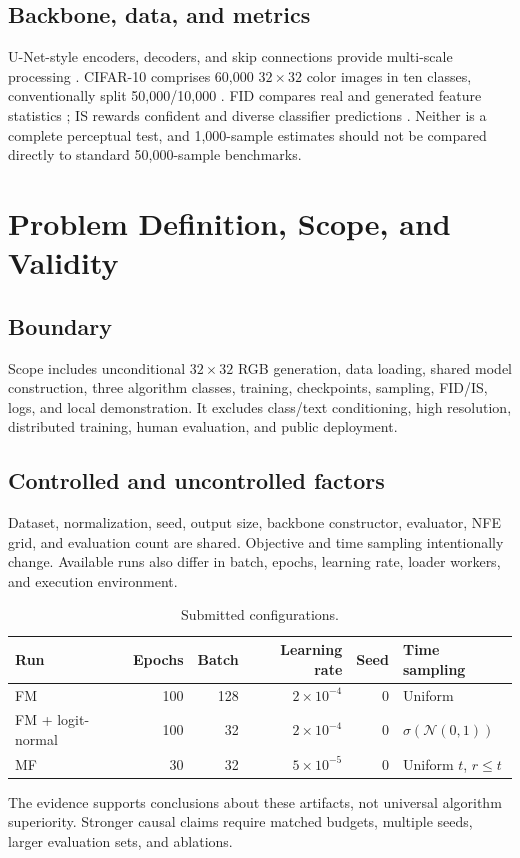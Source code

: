 \documentclass{iutbscthesis}
\begin{document}
\section{Backbone, data, and metrics}
U-Net-style encoders, decoders, and skip connections provide multi-scale processing \cite{ronneberger2015unet}. CIFAR-10 comprises 60,000 $32\times32$ color images in ten classes, conventionally split 50,000/10,000 \cite{krizhevsky2009learning}. FID compares real and generated feature statistics \cite{heusel2017gans}; IS rewards confident and diverse classifier predictions \cite{salimans2016improved}. Neither is a complete perceptual test, and 1,000-sample estimates should not be compared directly to standard 50,000-sample benchmarks.

\chapter{Problem Definition, Scope, and Validity}
\section{Boundary}
Scope includes unconditional $32\times32$ RGB generation, data loading, shared model construction, three algorithm classes, training, checkpoints, sampling, FID/IS, logs, and local demonstration. It excludes class/text conditioning, high resolution, distributed training, human evaluation, and public deployment.
\section{Controlled and uncontrolled factors}
Dataset, normalization, seed, output size, backbone constructor, evaluator, NFE grid, and evaluation count are shared. Objective and time sampling intentionally change. Available runs also differ in batch, epochs, learning rate, loader workers, and execution environment.
\begin{table}[htbp]\centering\caption{Submitted configurations.}\label{tab:config}
\begin{tabular}{lrrrrl}\toprule Run&Epochs&Batch&Learning rate&Seed&Time sampling\\\midrule
FM&100&128&$2\times10^{-4}$&0&Uniform\\
FM + logit-normal&100&32&$2\times10^{-4}$&0&$\sigma(\mathcal N(0,1))$\\
MF&30&32&$5\times10^{-5}$&0&Uniform $t$, $r\le t$\\\bottomrule\end{tabular}\end{table}
The evidence supports conclusions about these artifacts, not universal algorithm superiority. Stronger causal claims require matched budgets, multiple seeds, larger evaluation sets, and ablations.
\end{document}
